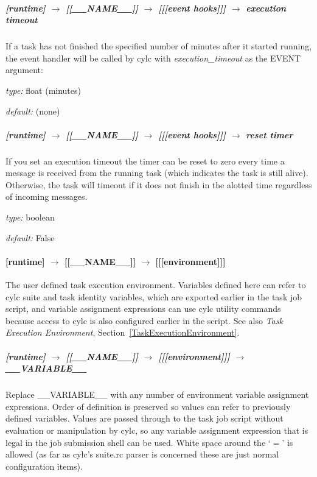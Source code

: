 \subparagraph[execution timeout]{[runtime] $\rightarrow$ [[\_\_NAME\_\_]] $\rightarrow$ [[[event hooks]]] $\rightarrow$ execution timeout}

If a task has not finished the specified number of minutes after it
started running, the event handler will be called by cylc with {\em
execution\_timeout} as the EVENT argument:
\begin{myitemize}
    \item {\em type:} float (minutes)
    \item {\em default:} (none)
\end{myitemize}

\subparagraph[reset timer]{[runtime] $\rightarrow$ [[\_\_NAME\_\_]] $\rightarrow$ [[[event hooks]]] $\rightarrow$ reset timer}

If you set an execution timeout the timer can be reset to zero every
time a message is received from the running task (which indicates the 
task is still alive).  Otherwise, the task will timeout if it does not
finish in the alotted time regardless of incoming messages.

\begin{myitemize}
\item {\em type:} boolean
\item {\em default:} False
\end{myitemize}

\paragraph[{[[[}environment{]]]}]{[runtime] $\rightarrow$ [[\_\_NAME\_\_]] $\rightarrow$ [[[environment]]]}

The user defined task execution environment. Variables defined here can
refer to cylc suite and task identity variables, which are exported
earlier in the task job script, and variable assignment expressions can
use cylc utility commands because access to cylc is also configured
earlier in the script.  See also {\em Task Execution Environment},
Section~\ref{TaskExecutionEnvironment}.

\subparagraph[\_\_VARIABLE\_\_ ]{[runtime] $\rightarrow$ [[\_\_NAME\_\_]] $\rightarrow$ [[[environment]]] $\rightarrow$ \_\_VARIABLE\_\_}
\label{AppendixTaskExecutionEnvironment}

Replace \_\_VARIABLE\_\_ with any number of environment variable
assignment expressions.
Order of definition is preserved so values can refer to previously
defined variables. Values are passed through to the task job script
without evaluation or manipulation by cylc, so any variable assignment
expression that is legal in the job submission shell can be used. 
White space around the `$=$' is allowed (as far as cylc's suite.rc 
parser is concerned these are just normal configuration items).

